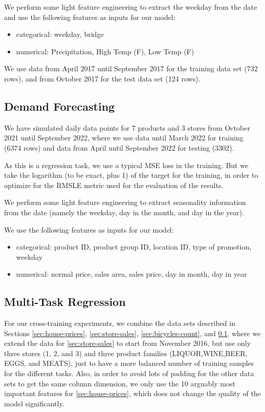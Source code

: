 \documentclass{article}
\begin{document}
We perform some light feature engineering to extract the weekday from the date and use the following features as inputs for our model:
\begin{itemize}
\item categorical: weekday, bridge
\item numerical: Precipitation, High Temp (F), Low Temp (F)
\end{itemize}

We use data from April 2017 until September 2017 for the training data set (732 rows), and from October 2017 for the test data set (124 rows).

\subsection{Demand Forecasting}
\label{sec:demand-forecasting}
We have simulated \cite{demand-forecasting} daily data points for 7 products and 3 stores from October 2021 until September 2022, where we use data until March 2022 for training (6374 rows) and data from April until September 2022 for testing (3302).

As this is a regression task, we use a typical MSE loss in the training. But we take the logarithm (to be exact, plus 1) of the target for the training, in order to optimize for the RMSLE metric used for the evaluation of the results.

We perform some light feature engineering to extract seasonality information from the date (namely the weekday, day in the month, and day in the year).

We use the following features as inputs for our model:
\begin{itemize}
\item categorical: product ID, product group ID, location ID, type of promotion, weekday
\item numerical: normal price, sales area, sales price, day in month, day in year
\end{itemize}

\subsection{Multi-Task Regression}
\label{sec:multi-task}
For our cross-training experiments, we combine the data sets described in Sections \ref{sec:house-prices}, \ref{sec:store-sales}, \ref{sec:bicycles-count}, and \ref{sec:demand-forecasting}, where we extend the data for \ref{sec:store-sales} to start from November 2016, but use only three stores (1, 2, and 3) and three product families (\textsc{LIQUOR,WINE,BEER}, \textsc{EGGS}, and \textsc{MEATS}), just to have a more balanced number of training samples for the different tasks. Also, in order to avoid lots of padding for the other data sets to get the same column dimension, we only use the 10 arguably most important features for \ref{sec:house-prices}, which does not change the quality of the model significantly.
\end{document}
